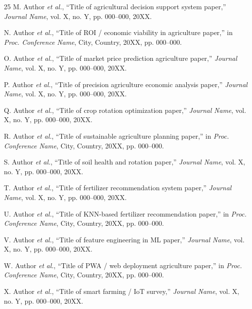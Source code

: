 \documentclass[conference]{IEEEtran}
\begin{document}
\begin{thebibliography}{25}
M. Author \textit{et al.}, ``Title of agricultural decision support system paper,'' \textit{Journal Name}, vol. X, no. Y, pp. 000--000, 20XX.

N. Author \textit{et al.}, ``Title of ROI / economic viability in agriculture paper,'' in \textit{Proc. Conference Name}, City, Country, 20XX, pp. 000--000.

O. Author \textit{et al.}, ``Title of market price prediction agriculture paper,'' \textit{Journal Name}, vol. X, no. Y, pp. 000--000, 20XX.

P. Author \textit{et al.}, ``Title of precision agriculture economic analysis paper,'' \textit{Journal Name}, vol. X, no. Y, pp. 000--000, 20XX.

Q. Author \textit{et al.}, ``Title of crop rotation optimization paper,'' \textit{Journal Name}, vol. X, no. Y, pp. 000--000, 20XX.

R. Author \textit{et al.}, ``Title of sustainable agriculture planning paper,'' in \textit{Proc. Conference Name}, City, Country, 20XX, pp. 000--000.

S. Author \textit{et al.}, ``Title of soil health and rotation paper,'' \textit{Journal Name}, vol. X, no. Y, pp. 000--000, 20XX.

T. Author \textit{et al.}, ``Title of fertilizer recommendation system paper,'' \textit{Journal Name}, vol. X, no. Y, pp. 000--000, 20XX.

U. Author \textit{et al.}, ``Title of KNN-based fertilizer recommendation paper,'' in \textit{Proc. Conference Name}, City, Country, 20XX, pp. 000--000.

V. Author \textit{et al.}, ``Title of feature engineering in ML paper,'' \textit{Journal Name}, vol. X, no. Y, pp. 000--000, 20XX.

W. Author \textit{et al.}, ``Title of PWA / web deployment agriculture paper,'' in \textit{Proc. Conference Name}, City, Country, 20XX, pp. 000--000.

X. Author \textit{et al.}, ``Title of smart farming / IoT survey,'' \textit{Journal Name}, vol. X, no. Y, pp. 000--000, 20XX.

\end{thebibliography}
\end{document}
